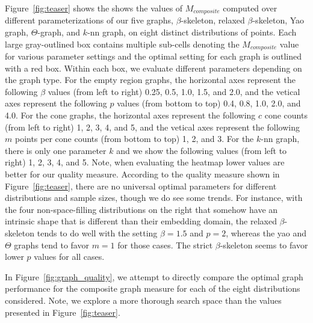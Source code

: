 Figure~\ref{fig:teaser} shows the shows the values of $M_{composite}$ computed over different parameterizations of our five graphs, $\beta$-skeleton, relaxed $\beta$-skeleton, Yao graph, $\Theta$-graph, and $k$-nn graph, on eight distinct distributions of points.
%
Each large gray-outlined box contains multiple sub-cells denoting the $M_{composite}$ value for various parameter settings and the optimal setting for each graph is outlined with a red box.
%
Within each box, we evaluate different parameters depending on the graph type.
%
For the empty region graphs, the horizontal axes represent the following $\beta$ values (from left to right)  0.25, 0.5, 1.0, 1.5, and 2.0, and the vetical axes represent the following $p$ values (from bottom to top) 0.4, 0.8, 1.0, 2.0, and 4.0.
%
For the cone graphs, the horizontal axes represent the following $c$ cone counts (from left to right) 1, 2, 3, 4, and 5, and the vetical axes represent the following $m$ points per cone counts (from bottom to top) 1, 2, and 3.
%
For the $k$-nn graph, there is only one parameter $k$ and we show the following values (from left to right)  1, 2, 3, 4, and 5.
%
Note, when evaluating the heatmap lower values are better for our quality measure.
%
According to the quality measure shown in Figure~\ref{fig:teaser}, there are no universal optimal parameters for different distributions and sample sizes, though we do see some trends.
%
For instance, with the four non-space-filling distributions on the right that somehow have an intrinsic shape that is different than their embedding domain, the relaxed $\beta$-skeleton tends to do well with the setting $\beta=1.5$ and $p=2$, whereas the yao and $\Theta$ graphs tend to favor $m=1$ for those cases.
%
The strict $\beta$-skeleton seems to favor lower $p$ values for all cases.

In Figure~\ref{fig:graph_quality}, we attempt to directly compare the optimal graph performance for the composite graph measure for each of the eight distributions considered.
%
Note, we explore a more thorough search space than the values presented in Figure~\ref{fig:teaser}.
%

